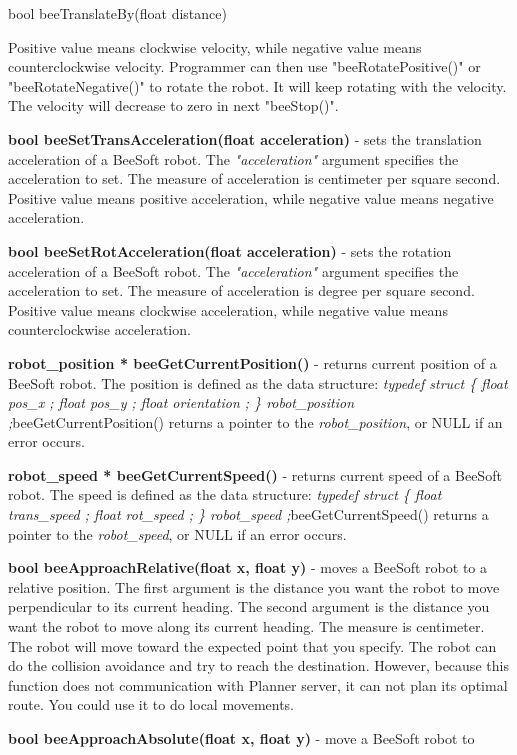 {\begin{enumerate}{\bf \item bool
    beeTranslateBy(float distance)}
  Positive value means clockwise velocity, while negative value means
  counterclockwise velocity. Programmer can then use
  "beeRotatePositive()" or "beeRotateNegative()" to rotate the robot.
  It will keep rotating with the velocity. The velocity will decrease
  to zero in next "beeStop()".\item {\bf bool
    beeSetTransAcceleration(float acceleration)} - sets the
  translation acceleration of a BeeSoft robot.  The {\it
    "acceleration"} argument specifies the acceleration to set. The
  measure of acceleration is centimeter per square second. Positive
  value means positive acceleration, while negative value means
  negative acceleration.\item {\bf bool beeSetRotAcceleration(float
    acceleration)} - sets the rotation acceleration of a BeeSoft
  robot.  The {\it "acceleration"} argument specifies the acceleration
  to set. The measure of acceleration is degree per square second.
  Positive value means clockwise acceleration, while negative value
  means counterclockwise acceleration.\item {\bf robot\_position *
    beeGetCurrentPosition()} - returns current position of a BeeSoft
  robot. The position is defined as the data structure: {\it typedef
    struct \{    float pos\_x ; float pos\_y ; float orientation ; \}
    robot\_position ;}beeGetCurrentPosition() returns a pointer to the
  {\it robot\_position}, or NULL if an error occurs.\item {\bf
    robot\_speed * beeGetCurrentSpeed()} - returns current speed of a
  BeeSoft robot. The speed is defined as the data structure:{\it
    typedef struct \{ float trans\_speed ; float rot\_speed ; \}
    robot\_speed ;}beeGetCurrentSpeed() returns a pointer to the {\it
    robot\_speed}, or NULL if an error occurs.\item {\bf bool
    beeApproachRelative(float x, float y)} - moves a
  BeeSoft robot to a relative position. The first argument is the
  distance you want the robot to move perpendicular to its current
  heading. The second argument is the distance you want the robot to
  move along its current heading.  The measure is centimeter. 
    The robot will move toward the expected point that you specify.
  The robot can do the collision avoidance and try to reach the
  destination. However, because this function does not communication
  with Planner server, it can not plan its optimal route. You could
  use it to do local movements. \item {\bf bool
    beeApproachAbsolute(float x, float y) }- move a BeeSoft robot to

\end{enumerate}}
